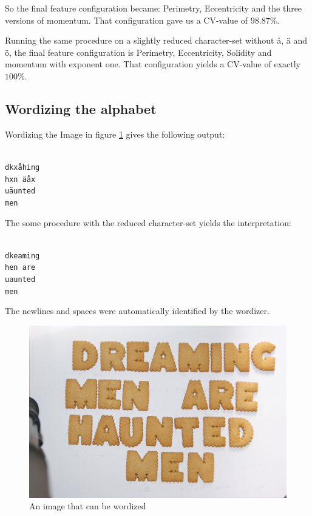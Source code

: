 \documentclass[a4paper,11pt]{article}
\begin{document}
So the final feature configuration became: Perimetry, Eccentricity and the three versions of momentum.
That configuration gave us a CV-value of $98.87\%$.

Running the same procedure on a slightly reduced character-set without å, ä and ö,
the final feature configuration is Perimetry, Eccentricity, Solidity and momentum with exponent one.
That configuration yields a CV-value of exactly $100\%$. 


\subsection{Wordizing the alphabet}
Wordizing the Image in figure \ref{fig:dreaming} gives the following output:

\texttt{ \\
dkxåhing \\
hxn äåx \\
uäunted \\
men \\
}

The some procedure with the reduced character-set yields the interpretation:

\texttt{ \\
dkeaming \\
hen are \\
uaunted \\
men \\
}

The newlines and spaces were automatically identified by the wordizer.

\begin{figure}[]
\begin{center}
\includegraphics[width=140mm]{dreaming.JPG}
\end{center}
\caption{An image that can be wordized}
\label{fig:dreaming}
\end{figure}
\end{document}
